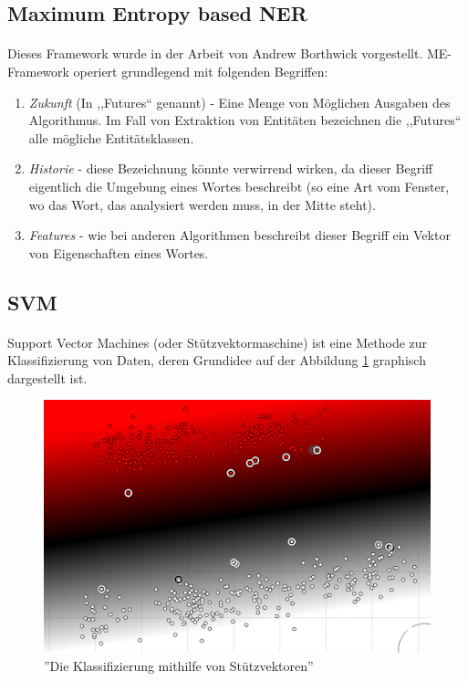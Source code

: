 \subsection{Maximum Entropy based NER} \label{sec:MEGRUND}
\paragraph{}
Dieses Framework wurde in der Arbeit von Andrew Borthwick\cite{borthwick1999maximum} vorgestellt. ME-Framework operiert grundlegend mit folgenden Begriffen:
\begin{enumerate}
\item \textit{Zukunft} (In \cite{borthwick1999maximum} ,,Futures`` genannt) - Eine Menge von Möglichen Ausgaben des Algorithmus. Im Fall von Extraktion von Entitäten bezeichnen die ,,Futures`` alle mögliche Entitätsklassen.
\item \textit{Historie} - diese Bezeichnung könnte verwirrend wirken, da dieser Begriff eigentlich die Umgebung eines Wortes beschreibt (so eine Art vom Fenster, wo das Wort, das analysiert werden muss, in der Mitte steht).
\item \textit{Features} - wie bei anderen Algorithmen beschreibt dieser Begriff ein Vektor von Eigenschaften eines Wortes.
\end{enumerate}

\subsection{SVM} \label{sec:SVNGRUND}
\paragraph{}
Support Vector Machines (oder Stützvektormaschine) ist eine Methode zur Klassifizierung von Daten, deren Grundidee\cite{meyer2014support} auf der Abbildung \ref{fig:SVM-INTRO} graphisch dargestellt ist. 

\begin{figure}
\centering
\includegraphics[width=\textwidth,angle=90]{Bilder/svm-intro.png}
\caption{''Die Klassifizierung mithilfe von Stützvektoren''}
\label{fig:SVM-INTRO}
\end{figure}

